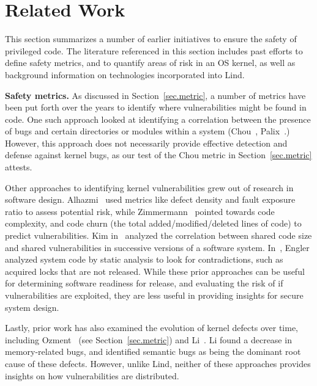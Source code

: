 \section{Related Work}
\label{sec.related_work}

This section summarizes a number of earlier initiatives to ensure the safety of
 privileged code. %
The literature referenced in this section includes past efforts to define safety metrics,
and to quantify areas of risk in an OS kernel, as well as background information
 on technologies incorporated into Lind.

\textbf{Safety metrics.} 
As discussed in Section~\ref{sec.metric}, a number of metrics have been put forth over the years to identify where vulnerabilities might be found in code.
One such approach looked at identifying a correlation between the presence of bugs
and certain directories or modules within a system (Chou~\cite{PittSFIeld},
Palix~\cite{palix2011faults}.)
However, this approach does not necessarily
provide effective detection and defense against kernel bugs, as our test of the
Chou metric in Section~\ref{sec.metric} attests.

Other approaches to identifying kernel vulnerabilities grew out of research in
software design.
Alhazmi~\cite{alhazmi2008application}
used metrics like defect density and fault exposure ratio to assess potential risk,
while Zimmermann~\cite{zimmermann2010searching}
 pointed towards code complexity, and code churn (the total added/modified/deleted
lines of code) to predict vulnerabilities. Kim in~\cite{kim2007vulnerability} analyzed
the correlation between shared code size and shared vulnerabilities in
successive versions of a software system. In~\cite{engler2001bugs}, Engler analyzed
system code by static analysis to look for contradictions, such as acquired locks that are
not released. While
these prior approaches can be useful for determining software readiness for release, and
evaluating the risk of if vulnerabilities are exploited,
they are less useful in providing insights for secure system design.

Lastly, prior work has also examined the evolution of kernel defects over time, including
Ozment~\cite{ozment2006milk} (see Section~\ref{sec.metric}) and Li~\cite{li2006have}.
Li found a decrease in memory-related
bugs, and identified semantic bugs as being the dominant root cause of these
defects.
However, unlike Lind, neither of these approaches provides insights
on how vulnerabilities are distributed.

